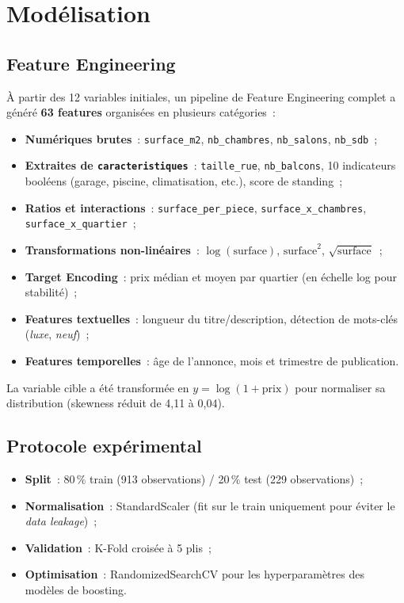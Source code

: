 \documentclass[12pt, a4paper]{article}
\begin{document}
\section{Modélisation}

\subsection{Feature Engineering}

À partir des 12 variables initiales, un pipeline de Feature Engineering complet a généré \textbf{63 features} organisées en plusieurs catégories~:

\begin{itemize}
    \item \textbf{Numériques brutes}~: \texttt{surface\_m2}, \texttt{nb\_chambres}, \texttt{nb\_salons}, \texttt{nb\_sdb}~;
    \item \textbf{Extraites de \texttt{caracteristiques}}~: \texttt{taille\_rue}, \texttt{nb\_balcons}, 10 indicateurs booléens (garage, piscine, climatisation, etc.), score de standing~;
    \item \textbf{Ratios et interactions}~: \texttt{surface\_per\_piece}, \texttt{surface\_x\_chambres}, \texttt{surface\_x\_quartier}~;
    \item \textbf{Transformations non-linéaires}~: $\log(\text{surface})$, $\text{surface}^2$, $\sqrt{\text{surface}}$~;
    \item \textbf{Target Encoding}~: prix médian et moyen par quartier (en échelle log pour stabilité)~;
    \item \textbf{Features textuelles}~: longueur du titre/description, détection de mots-clés (\textit{luxe}, \textit{neuf})~;
    \item \textbf{Features temporelles}~: âge de l'annonce, mois et trimestre de publication.
\end{itemize}

La variable cible a été transformée en $y = \log(1 + \text{prix})$ pour normaliser sa distribution (skewness réduit de 4,11 à 0,04).

\subsection{Protocole expérimental}

\begin{itemize}
    \item \textbf{Split}~: 80\,\% train (913 observations) / 20\,\% test (229 observations)~;
    \item \textbf{Normalisation}~: StandardScaler (fit sur le train uniquement pour éviter le \textit{data leakage})~;
    \item \textbf{Validation}~: K-Fold croisée à 5 plis~;
    \item \textbf{Optimisation}~: RandomizedSearchCV pour les hyperparamètres des modèles de boosting.
\end{itemize}
\end{document}
